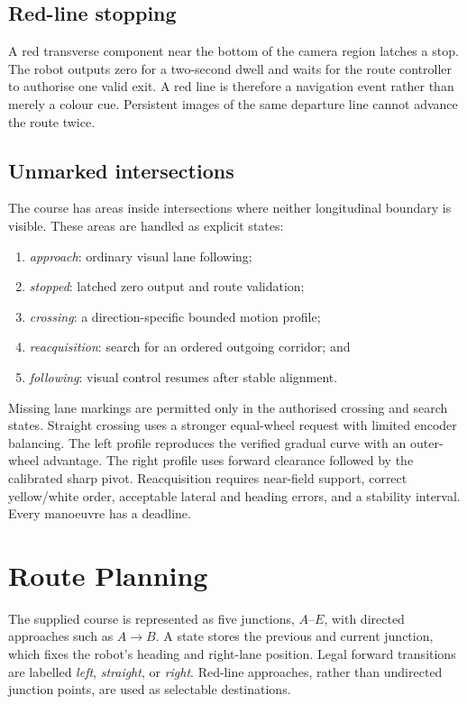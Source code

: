 \documentclass[10pt,a4paper,twocolumn]{article}
\begin{document}
\subsection{Red-line stopping}

A red transverse component near the bottom of the camera region latches a stop.
The robot outputs zero for a two-second dwell and waits for the route controller
to authorise one valid exit. A red line is therefore a navigation event rather
than merely a colour cue. Persistent images of the same departure line cannot
advance the route twice.

\subsection{Unmarked intersections}

The course has areas inside intersections where neither longitudinal boundary
is visible. These areas are handled as explicit states:

\begin{enumerate}
    \item \emph{approach}: ordinary visual lane following;
    \item \emph{stopped}: latched zero output and route validation;
    \item \emph{crossing}: a direction-specific bounded motion profile;
    \item \emph{reacquisition}: search for an ordered outgoing corridor; and
    \item \emph{following}: visual control resumes after stable alignment.
\end{enumerate}

Missing lane markings are permitted only in the authorised crossing and search
states. Straight crossing uses a stronger equal-wheel request with limited
encoder balancing. The left profile reproduces the verified gradual curve with
an outer-wheel advantage. The right profile uses forward clearance followed by
the calibrated sharp pivot. Reacquisition requires near-field support, correct
yellow/white order, acceptable lateral and heading errors, and a stability
interval. Every manoeuvre has a deadline.

\section{Route Planning}

The supplied course is represented as five junctions, $A$--$E$, with directed
approaches such as $A\!\rightarrow\!B$. A state stores the previous and current
junction, which fixes the robot's heading and right-lane position. Legal forward transitions
are labelled \emph{left}, \emph{straight}, or
\emph{right}. Red-line approaches, rather than undirected junction points, are
used as selectable destinations.
\end{document}
